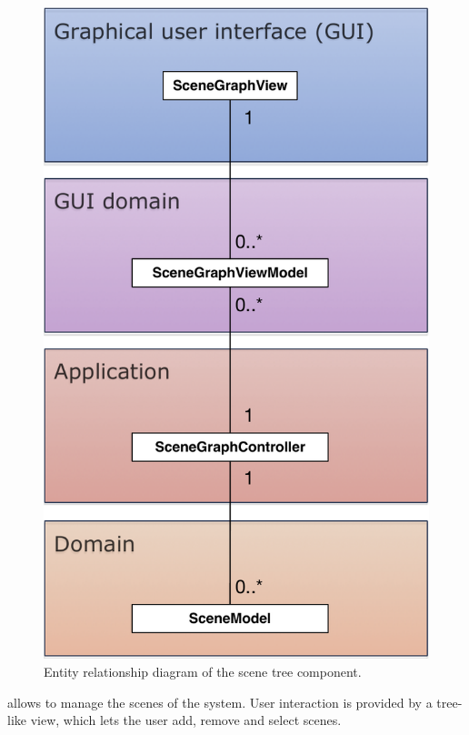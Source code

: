 \documentclass[%
    a4paper,    %
    justified,  %
    nobib,      %
    openany     %
]{tufte-book}
\begin{document}
\begin{figure}[ht]
  \caption{Entity relationship diagram of the scene tree component.}
  \label{fig:scene-graph-erd}
  \includegraphics[width=0.75\linewidth]{images/scene-graph-erd}
\end{figure}

 allows to manage the scenes of the system.
User interaction is provided by a tree-like view, which lets the user add,
remove and select scenes.


% 
% 
\end{document}
